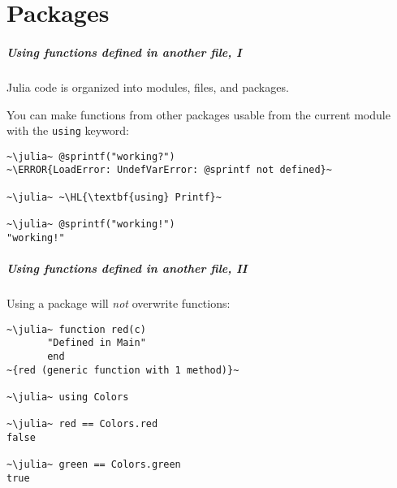 \documentclass[english,serif,mathserif,xcolor=pdftex,dvipsnames,table]{beamer}
\begin{document}
\part{Packages}







\begin{frame}[fragile]
  \frametitle{Using functions defined in another file, I}
  \small

  Julia code is organized into modules, files, and packages.

  \+ You can make functions from other packages usable from the
  current module with the \texttt{using} keyword:
\begin{lstlisting}
~\julia~ @sprintf("working?")
~\ERROR{LoadError: UndefVarError: @sprintf not defined}~

~\julia~ ~\HL{\textbf{using} Printf}~

~\julia~ @sprintf("working!")
"working!"
\end{lstlisting}
\end{frame}

\begin{frame}
  \frametitle{Using functions defined in another file, II}
  Using a package will \emph{not} overwrite functions:
\begin{lstlisting}
~\julia~ function red(c)
       "Defined in Main"
       end
~{red (generic function with 1 method)}~

~\julia~ using Colors

~\julia~ red == Colors.red
false

~\julia~ green == Colors.green
true
\end{lstlisting}
\end{frame}
\end{document}
